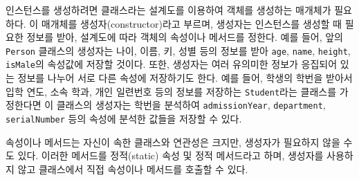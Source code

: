 인스턴스를 생성하려면 클래스라는 설계도를 이용하여 객체를 생성하는 매개체가 필요하다. 이 매개체를 생성자(constructor)라고 부르며, 생성자는 인스턴스를 생성할 때 필요한 정보를 받아, 설계도에 따라 객체의 속성이나 메서드를 정한다. 예를 들어, 앞의 \texttt{Person} 클래스의 생성자는 나이, 이름, 키, 성별 등의 정보를 받아 \texttt{age}, \texttt{name}, \texttt{height}, \texttt{isMale}의 속성값에 저장할 것이다. 또한, 생성자는 여러 유의미한 정보가 응집되어 있는 정보를 나누어 서로 다른 속성에 저장하기도 한다. 예를 들어, 학생의 학번을 받아서 입학 연도, 소속 학과, 개인 일련번호 등의 정보를 저장하는 \texttt{Student}라는 클래스를 가정한다면 이 클래스의 생성자는 학번을 분석하여 \texttt{admissionYear}, \texttt{department}, \texttt{serialNumber} 등의 속성에 분석한 값들을 저장할 수 있다.

속성이나 메서드는 자신이 속한 클래스와 연관성은 크지만, 생성자가 필요하지 않을 수도 있다. 이러한 메서드를 정적(static) 속성 및 정적 메서드라고 하며, 생성자를 사용하지 않고 클래스에서 직접 속성이나 메서드를 호출할 수 있다.
